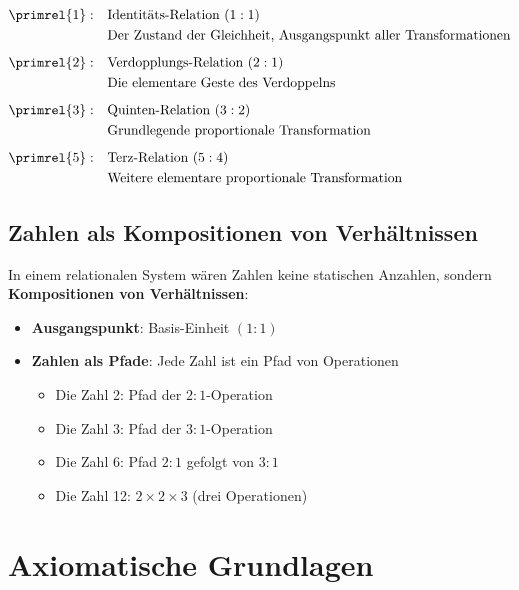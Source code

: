 	\begin{definition}
		\begin{align}
			\primrel{1}: \quad &\text{Identitäts-Relation } (1:1) \\
			&\text{Der Zustand der Gleichheit, Ausgangspunkt aller Transformationen} \\[0.5em]
			\primrel{2}: \quad &\text{Verdopplungs-Relation } (2:1) \\
			&\text{Die elementare Geste des Verdoppelns} \\[0.5em]
			\primrel{3}: \quad &\text{Quinten-Relation } (3:2) \\
			&\text{Grundlegende proportionale Transformation} \\[0.5em]
			\primrel{5}: \quad &\text{Terz-Relation } (5:4) \\
			&\text{Weitere elementare proportionale Transformation}
		\end{align}
	\end{definition}
	
	\subsection{Zahlen als Kompositionen von Verhältnissen}
	
	In einem relationalen System wären Zahlen keine statischen Anzahlen, sondern \textbf{Kompositionen von Verhältnissen}:
	
	\begin{itemize}
		\item \textbf{Ausgangspunkt}: Basis-Einheit $(1:1)$
		\item \textbf{Zahlen als Pfade}: Jede Zahl ist ein Pfad von Operationen
		\begin{itemize}
			\item Die Zahl 2: Pfad der $2:1$-Operation
			\item Die Zahl 3: Pfad der $3:1$-Operation  
			\item Die Zahl 6: Pfad $2:1$ gefolgt von $3:1$
			\item Die Zahl 12: $2 \times 2 \times 3$ (drei Operationen)
		\end{itemize}
	\end{itemize}
	
	\section{Axiomatische Grundlagen}
	
